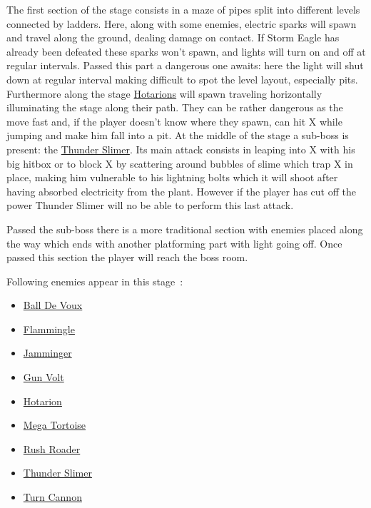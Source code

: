 The first section of the stage consists in a maze of pipes split into different levels connected by ladders. Here, along with some enemies, electric sparks will spawn and travel along the ground, dealing damage on contact. If Storm Eagle has already been defeated these sparks won't spawn, and lights will turn on and off at regular intervals. Passed this part a dangerous one awaits: here the light will shut down at regular interval making difficult to spot the level layout, especially pits. Furthermore along the stage  \hyperlink{enem:Hotarion}{Hotarions} will spawn traveling horizontally illuminating the stage along their path. They can be rather dangerous as the move fast and, if the player doesn't know where they spawn, can hit X while jumping and make him fall into a pit.
At the middle of the stage a sub-boss is present: the \hyperlink{miniboss:Thunder_Slimer}{Thunder Slimer}. Its main attack consists in leaping into X with his big hitbox or to block X by scattering around bubbles of slime which trap X in place, making him vulnerable to his lightning bolts which it will shoot after having absorbed electricity from the plant. However if the player has cut off the power Thunder Slimer will no be able to perform this last attack.

Passed the sub-boss there is a more traditional section with enemies placed along the way which ends with another platforming part with light going off. Once passed this section the player will reach the boss room.

Following enemies appear in this stage~\cite{wiki:Power_plant}:
\begin{itemize}
	\item \hyperlink{enem:Ball_De_Voux}{Ball De Voux}
	\item \hyperlink{enem:Flammingle}{Flammingle}
	\item \hyperlink{enem:Jamminger}{Jamminger}
	\item \hyperlink{enem:Gun_Volt}{Gun Volt}
	\item \hyperlink{enem:Hotarion}{Hotarion}
	\item \hyperlink{enem:Mega_Tortoise}{Mega Tortoise}
	\item \hyperlink{enem:Rush_Roader}{Rush Roader}
	\item \hyperlink{miniboss:Thunder_Slimer}{Thunder Slimer}
	\item \hyperlink{enem:Turn_Cannon}{Turn Cannon}
\end{itemize}


